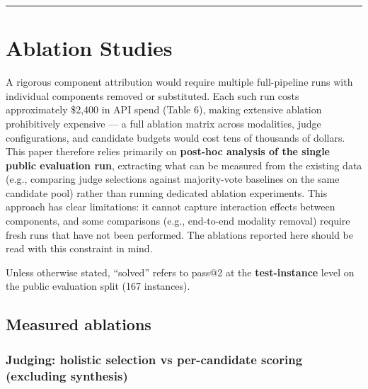 \documentclass[11pt]{article}
\begin{document}
\begin{center}\rule{0.5\linewidth}{0.5pt}\end{center}

\hypertarget{ablation-studies}{%
\section{Ablation Studies}\label{ablation-studies}}

A rigorous component attribution would require multiple full-pipeline
runs with individual components removed or substituted. Each such run
costs approximately \$2,400 in API spend (Table 6), making extensive
ablation prohibitively expensive --- a full ablation matrix across
modalities, judge configurations, and candidate budgets would cost tens
of thousands of dollars. This paper therefore relies primarily on
\textbf{post-hoc analysis of the single public evaluation run},
extracting what can be measured from the existing data (e.g., comparing
judge selections against majority-vote baselines on the same candidate
pool) rather than running dedicated ablation experiments. This approach
has clear limitations: it cannot capture interaction effects between
components, and some comparisons (e.g., end-to-end modality removal)
require fresh runs that have not been performed. The ablations reported
here should be read with this constraint in mind.

Unless otherwise stated, ``solved'' refers to pass@2 at the
\textbf{test-instance} level on the public evaluation split (167
instances).

\hypertarget{measured-ablations}{%
\subsection{Measured ablations}\label{measured-ablations}}

\hypertarget{judging-holistic-selection-vs-per-candidate-scoring-excluding-synthesis}{%
\subsubsection{Judging: holistic selection vs per-candidate scoring
(excluding
synthesis)}\label{judging-holistic-selection-vs-per-candidate-scoring-excluding-synthesis}}
\end{document}
